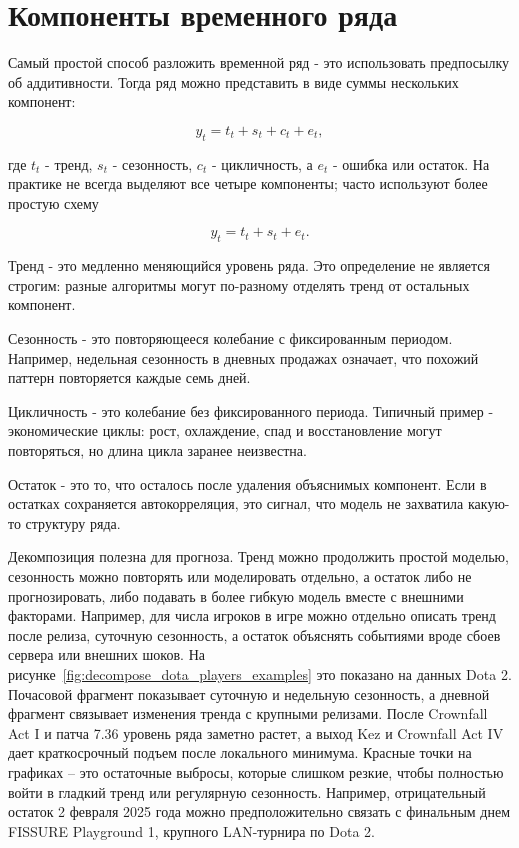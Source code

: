 \documentclass[12pt,fleqn]{article}
\begin{document}
\section{Компоненты временного ряда}


Самый простой способ разложить временной ряд - это использовать предпосылку об аддитивности.
Тогда ряд можно представить в виде суммы нескольких компонент:

\[
y_t = t_t + s_t + c_t + e_t,
\]

где \(t_t\) - тренд, \(s_t\) - сезонность, \(c_t\) - цикличность, а \(e_t\) - ошибка или остаток.
На практике не всегда выделяют все четыре компоненты; часто используют более простую схему

\[
y_t = t_t + s_t + e_t.
\]

Тренд - это медленно меняющийся уровень ряда.
Это определение не является строгим: разные алгоритмы могут по-разному отделять тренд от остальных компонент.

Сезонность - это повторяющееся колебание с фиксированным периодом.
Например, недельная сезонность в дневных продажах означает, что похожий паттерн повторяется каждые семь дней.

Цикличность - это колебание без фиксированного периода.
Типичный пример - экономические циклы: рост, охлаждение, спад и восстановление могут повторяться, но длина цикла заранее неизвестна.

Остаток - это то, что осталось после удаления объяснимых компонент.
Если в остатках сохраняется автокорреляция, это сигнал, что модель не захватила какую-то структуру ряда.

Декомпозиция полезна для прогноза.
Тренд можно продолжить простой моделью, сезонность можно повторять или моделировать отдельно, а остаток либо не прогнозировать, либо подавать в более гибкую модель вместе с внешними факторами.
Например, для числа игроков в игре можно отдельно описать тренд после релиза, суточную сезонность, а остаток объяснять событиями вроде сбоев сервера или внешних шоков.
На рисунке~\ref{fig:decompose_dota_players_examples} это показано на данных Dota 2.
Почасовой фрагмент показывает суточную и недельную сезонность, а дневной фрагмент связывает изменения тренда с крупными релизами.
После Crownfall Act I и патча 7.36 уровень ряда заметно растет, а выход Kez и Crownfall Act IV дает краткосрочный подъем после локального минимума.
Красные точки на графиках -- это остаточные выбросы, которые слишком резкие, чтобы полностью войти в гладкий тренд или регулярную сезонность.
Например, отрицательный остаток 2 февраля 2025 года можно предположительно связать с финальным днем FISSURE Playground 1, крупного LAN-турнира по Dota 2.
\end{document}
